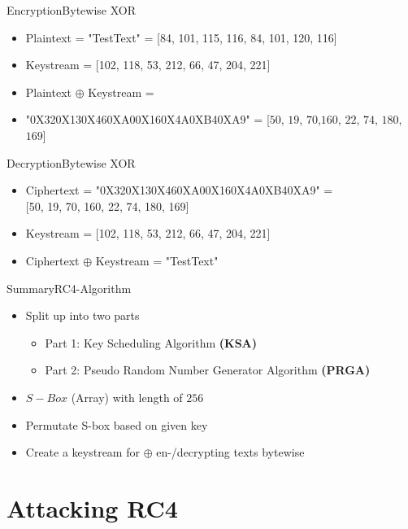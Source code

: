 \documentclass[
	aspectratio=169,	%
	onlytextwidth,		%
	t					%
	]{beamer}
\begin{document}
\begin{frame}[fragile]{Encryption}{Bytewise XOR}
	\small
	\begin{itemize}
		\item Plaintext = "TestText" = {\color{purple}[84, 101, 115, 116, 84, 101, 120, 116]}
		\item Keystream = {\color{olive}[102, 118, 53, 212, 66, 47, 204, 221]}
		\item Plaintext $\oplus$ Keystream =
		\item "0X320X130X460XA00X160X4A0XB40XA9" = [$50$, $19$, $70$,$160$, $22$, $74$, $180$, $169$]
	\end{itemize}
	\normalsize
\end{frame}

\begin{frame}[fragile]{Decryption}{Bytewise XOR}
	\small
	\begin{itemize}
		\item Ciphertext = "0X320X130X460XA00X160X4A0XB40XA9" = \\{\color{purple}[50, 19, 70, 160, 22, 74, 180, 169]}
		\item Keystream = {\color{olive}[102, 118, 53, 212, 66, 47, 204, 221]} 
		\item Ciphertext $\oplus$ Keystream = "TestText"
	\end{itemize}
	\normalsize
\end{frame}

\begin{frame}[fragile]{Summary}{RC4-Algorithm}
	\begin{itemize}
		\item Split up into two parts
		\begin{itemize}
			\item Part 1: Key Scheduling Algorithm \textbf{(KSA)}
			\item Part 2: Pseudo Random Number Generator Algorithm \textbf{(PRGA)}
		\end{itemize}
		\item $S-Box$ (Array) with length of $256$
		\item Permutate S-box based on given key
		\item Create a keystream for $\oplus$ en-/decrypting texts bytewise
	\end{itemize}
\end{frame}

\section{Attacking RC4}
\end{document}
